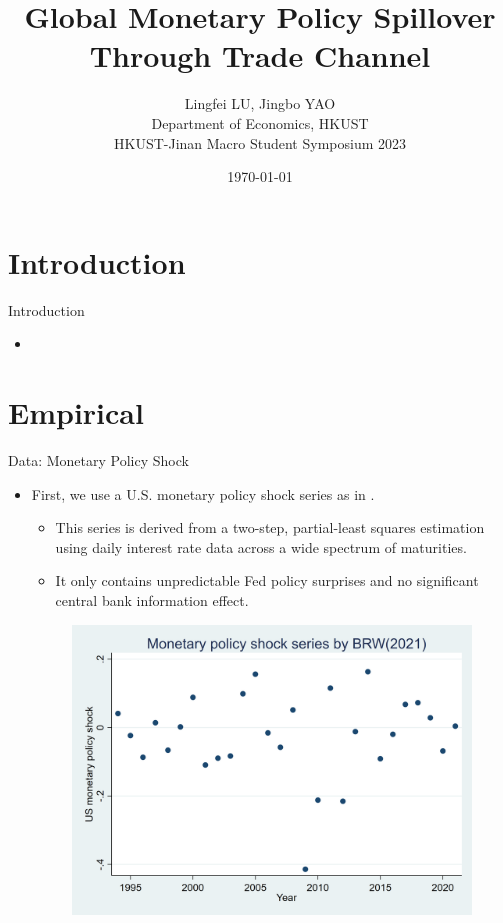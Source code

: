 \documentclass[10pt]{beamer}
\title[Monetary Policy Spillover Through Trade Channel]{Global Monetary Policy Spillover Through Trade Channel}
\author[Yao\&Lu (2023)]{\large Lingfei LU, Jingbo YAO \\ \vspace{0.5cm} Department of Economics, HKUST \\ \vspace{0.5cm} HKUST-Jinan Macro Student Symposium 2023}
\date{\today}
\begin{document}
	
    \begin{frame}[plain]
	\maketitle {}
    \end{frame}


\section{Introduction}

\begin{frame}{Introduction}
	\begin{itemize}
		\item 
	\end{itemize}
\end{frame}


\section{Empirical}

\begin{frame}{Data: Monetary Policy Shock}
    \begin{itemize}
        \item First, we use a U.S. monetary policy shock series as in \cite{brw2021}.
        \begin{itemize}
            \item This series is derived from a two-step, partial-least squares estimation using daily interest rate data across a wide spectrum of maturities.
            \item It only contains unpredictable Fed policy surprises and no significant central bank information effect.
        \end{itemize}
        \begin{figure}[htbp]
		\centering
		\includegraphics[width=0.65\columnwidth]{latex/BRW.png}
		\label{sum.brw}
	\end{figure}
    \end{itemize}
\end{frame}
\end{document}
